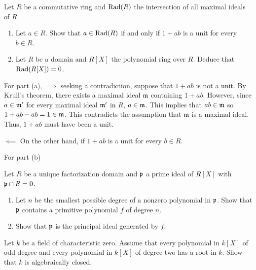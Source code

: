 \begin{problem}
  Let \(R\) be a commutative ring and \(\operatorname{Rad}(R)\) the intersection of all
  maximal ideals of \(R\).
  \begin{enumerate}[label=(\alph*)]
  \item Let \(a\in R\). Show that \(a\in\operatorname{Rad}(R)\) if and only if \(1+ab\)
    is a unit for every \(b\in R\).
  \item Let \(R\) be a domain and \(R[X]\) the polynomial ring over
    \(R\). Deduce that \(\operatorname{Rad}(R[X])=0\).
  \end{enumerate}
\end{problem}
\begin{solution}
  For part (a), \(\implies\) seeking a contradiction, suppose that \(1+ab\)
  is not a unit. By Krull's theorem, there exists a maximal ideal
  \(\mathfrak{m}\) containing \(1+ab\). However, since \(a\in\mathfrak{m}'\) for every
  maximal ideal \(\mathfrak{m}'\) in \(R\), \(a\in\mathfrak{m}\). This implies that
  \(ab\in\mathfrak{m}\) so \(1+ab-ab=1\in\mathfrak{m}\). This contradicts the
  assumption that \(\mathfrak{m}\) is a maximal ideal. Thus, \(1+ab\) must have
  been a unit.

  \(\impliedby\) On the other hand, if \(1+ab\) is a unit for every \(b\in
  R\).

  For part (b)
\end{solution}

\begin{problem}
  Let \(R\) be a unique factorization domain and \(\mathfrak{p}\) a prime ideal
  of \(R[X]\) with \(\mathfrak{p}\cap R=0\).
  \begin{enumerate}[label=(\alph*)]
  \item Let \(n\) be the smallest possible degree of a nonzero polynomial
    in \(\mathfrak{p}\). Show that \(\mathfrak{p}\) contains a primitive polynomial
    \(f\) of degree \(n\).
  \item Show that \(\mathfrak{p}\) is the principal ideal generated by \(f\).
  \end{enumerate}
\end{problem}
\begin{solution}
\end{solution}

\begin{problem}
  Let \(k\) be a field of characteristic zero. Assume that every polynomial
  in \(k[X]\) of odd degree and every polynomial in \(k[X]\) of degree two
  has a root in \(k\). Show that \(k\) is algebraically closed.
\end{problem}
\begin{solution}
\end{solution}

